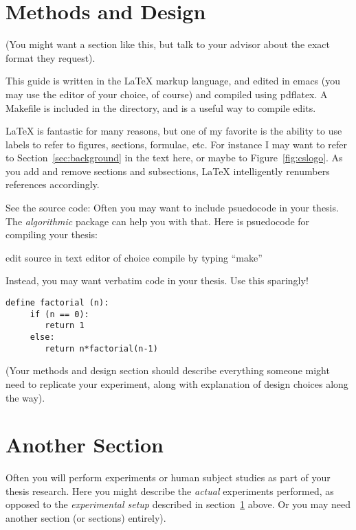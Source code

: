 \documentclass[final]{union-cs-thesis}
\begin{document}
\section{Methods and Design} \label{sec:methods}

(You might want a section like this, but talk to your advisor about
the exact format they request).

This guide is written in the LaTeX markup language, and edited in
emacs (you may use the editor of your choice, of course) and compiled
using pdflatex.  A Makefile is included in the directory, and is a
useful way to compile edits.

LaTeX is fantastic for many reasons, but one of my favorite is the
ability to use labels to refer to figures, sections, formulae, etc.
For instance I may want to refer to Section~\ref{sec:background} in
the text here, or maybe to Figure~\ref{fig:cslogo}.  As you add and remove sections and subsections, LaTeX
intelligently renumbers references accordingly.

See the source code:
Often you may want to include psuedocode in your thesis.  The {\em
algorithmic} package can help you with that.  Here is psuedocode for
compiling your thesis:

\begin{algorithmic}[1]
  \STATE edit source in text editor of choice
  \STATE compile by typing ``make''
\ENDWHILE
\end{algorithmic}

Instead, you may want verbatim code in your thesis.  Use this
sparingly!
\begin{verbatim}
define factorial (n):
     if (n == 0):
        return 1
     else:
        return n*factorial(n-1)
\end{verbatim}

(Your methods and design section should describe everything someone
might need to replicate your experiment, along with explanation of
design choices along the way).

\section{Another Section}

Often you will perform experiments or human subject studies as part of
your thesis research.  Here you might describe the {\em actual} experiments
performed, as opposed to the {\em experimental setup} described in
section~\ref{sec:methods} above.  Or you may need another section (or
sections) entirely).
\end{document}
